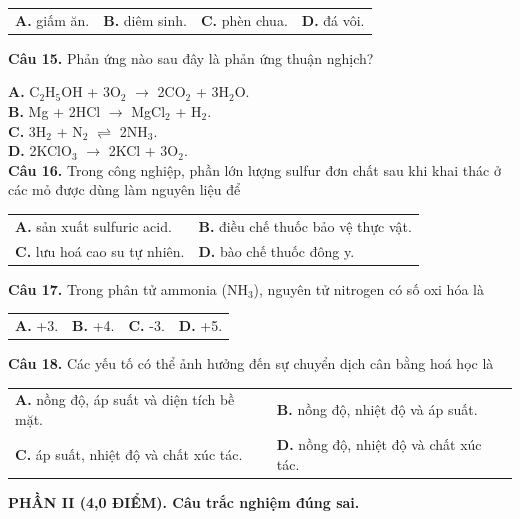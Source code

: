 \documentclass[11pt,a4paper]{article}
\begin{document}
\begin{tabularx}{\textwidth}{@{}XXXX@{}}
\textbf{A.} giấm ăn. & \textbf{B.} diêm sinh. & \textbf{C.} phèn chua. & \textbf{D.} đá vôi. \\
\end{tabularx}

\textbf{Câu 15.} Phản ứng nào sau đây là phản ứng thuận nghịch?

\quad \textbf{A.} C$_{2}$H$_{5}$OH + 3O$_{2}$ $\longrightarrow$ 2CO$_{2}$ + 3H$_{2}$O.\\
\quad \textbf{B.} Mg + 2HCl $\longrightarrow$ MgCl$_{2}$ + H$_{2}$.\\
\quad \textbf{C.} 3H$_{2}$ + N$_{2}$ $\rightleftharpoons$ 2NH$_{3}$.\\
\quad \textbf{D.} 2KClO$_{3}$ $\longrightarrow$ 2KCl + 3O$_{2}$.\\

\textbf{Câu 16.} Trong công nghiệp, phần lớn lượng sulfur đơn chất sau khi khai thác ở các mỏ được dùng làm nguyên liệu để

\begin{tabularx}{\textwidth}{@{}XX@{}}
\textbf{A.} sản xuất sulfuric acid. & \textbf{B.} điều chế thuốc bảo vệ thực vật. \\
\textbf{C.} lưu hoá cao su tự nhiên. & \textbf{D.} bào chế thuốc đông y. \\
\end{tabularx}

\textbf{Câu 17.} Trong phân tử ammonia (NH$_{3}$), nguyên tử nitrogen có số oxi hóa là

\begin{tabularx}{\textwidth}{@{}XXXX@{}}
\textbf{A.} +3. & \textbf{B.} +4. & \textbf{C.} -3. & \textbf{D.} +5. \\
\end{tabularx}

\textbf{Câu 18.} Các yếu tố có thể ảnh hưởng đến sự chuyển dịch cân bằng hoá học là

\begin{tabularx}{\textwidth}{@{}XX@{}}
\textbf{A.} nồng độ, áp suất và diện tích bề mặt. & \textbf{B.} nồng độ, nhiệt độ và áp suất. \\
\textbf{C.} áp suất, nhiệt độ và chất xúc tác. & \textbf{D.} nồng độ, nhiệt độ và chất xúc tác. \\
\end{tabularx}

\vspace{6pt}
{\color{myGreen}\bfseries\large PHẦN II (4,0 ĐIỂM). Câu trắc nghiệm đúng sai.}
\end{document}
